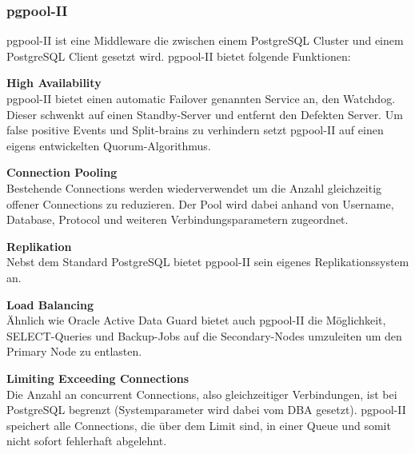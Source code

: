 
\subsubsection{pgpool-II}
\begin{flushleft}
    pgpool-II ist eine Middleware die zwischen einem \Gls{PostgreSQL Cluster} und einem PostgreSQL Client gesetzt wird.
    pgpool-II bietet folgende Funktionen\cite{EXVNLICT,3XWCD3KX}:
\end{flushleft}
\begin{flushleft}
    \textbf{High Availability}\\
    pgpool-II bietet einen automatic \Gls{Failover} genannten Service an, den Watchdog.
    Dieser schwenkt auf einen Standby-Server und entfernt den Defekten Server.
    Um false positive Events und Split-brains zu verhindern setzt pgpool-II auf einen eigens entwickelten \Gls{Quorum}-Algorithmus.
\end{flushleft}
\begin{flushleft}
    \textbf{Connection Pooling}\\
    Bestehende Connections werden wiederverwendet um die Anzahl gleichzeitig offener Connections zu reduzieren.
    Der Pool wird dabei anhand von Username, Database, Protocol und weiteren Verbindungsparametern zugeordnet.
\end{flushleft}
\begin{flushleft}
    \textbf{Replikation}\\
    Nebst dem Standard \Gls{PostgreSQL} bietet pgpool-II sein eigenes Replikationssystem an.
\end{flushleft}
\begin{flushleft}
    \textbf{Load Balancing}\\
    Ähnlich wie Oracle Active Data Guard \cite{6294443C} bietet auch pgpool-II die Möglichkeit, SELECT-Queries und Backup-Jobs auf die Secondary-Nodes umzuleiten um den Primary Node zu entlasten.
\end{flushleft}
\begin{flushleft}
    \textbf{Limiting Exceeding Connections}\\
    Die Anzahl an concurrent Connections, also gleichzeitiger Verbindungen, ist bei \Gls{PostgreSQL} begrenzt (Systemparameter wird dabei vom DBA gesetzt).
    pgpool-II speichert alle Connections, die über dem Limit sind, in einer Queue und somit nicht sofort fehlerhaft abgelehnt.
\end{flushleft}
